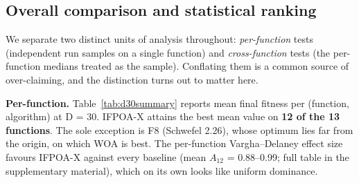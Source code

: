 \documentclass[preprint,12pt]{elsarticle}
\begin{document}
\subsection{Overall comparison and statistical ranking}
\label{subsec5-1}
We separate two distinct units of analysis throughout: \emph{per-function} tests (independent run samples on a single function) and \emph{cross-function} tests (the per-function medians treated as the sample). Conflating them is a common source of over-claiming, and the distinction turns out to matter here.

\textbf{Per-function.} Table~\ref{tab:d30summary} reports mean final fitness per (function, algorithm) at D = 30. IFPOA-X attains the best mean value on \textbf{12 of the 13 functions}. The sole exception is F8 (Schwefel 2.26), whose optimum lies far from the origin, on which WOA is best. The per-function Vargha--Delaney effect size favours IFPOA-X against every baseline (mean $A_{12}$ = 0.88--0.99; full table in the supplementary material), which on its own looks like uniform dominance.
\end{document}

